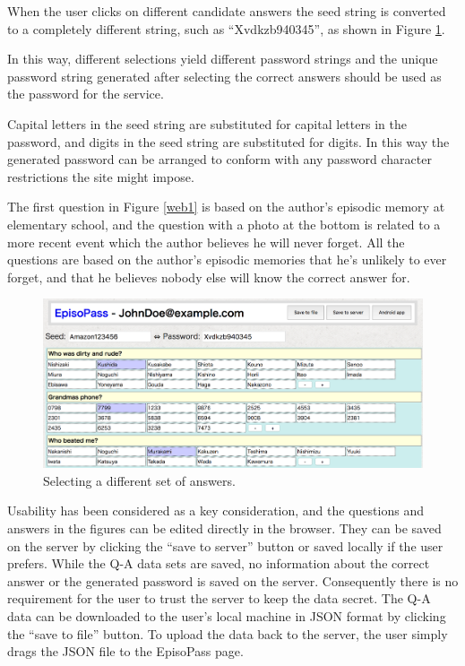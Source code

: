 \documentclass[runningheads,a4paper]{llncs}
\begin{document}
When the user clicks on different candidate answers 
the seed string is converted to a completely different string, such as
``\textsf{Xvdkzb940345}'', as shown in Figure \ref{web11}.

In this way, different selections yield different password strings and
the unique password string generated after selecting the correct answers should be
used as the password for the service.

%

Capital letters in the seed string are substituted for capital letters in the password,
and digits in the seed string are substituted for digits. In this way
the generated password can be arranged to conform with any password character restrictions
the site might impose.

The first question in Figure \ref{web1}
is based on the author's episodic memory at elementary school,
and the question with a photo at the bottom is related to a more recent event
which the author believes he will never forget.
All the questions are based on the author's episodic memories that he's unlikely to ever forget,
and that he believes nobody else will know the correct answer for.

\begin{figure}
\centering
\includegraphics[width=1.0\columnwidth]{figures/8447eaba1ede0f678b3ce6fea63681f3}
\caption{Selecting a different set of answers.}
\label{web11}
\end{figure}

Usability has been considered as a key consideration, and the questions 
and answers in the figures can be edited directly in the browser. They can be
saved on the server by clicking the ``save to server'' button or saved locally
if the user prefers.
While the Q-A data sets are saved, no information about the correct answer or the
generated password is saved on the server. Consequently there is no requirement for the user
to trust the server to keep the data secret.
The Q-A data can be downloaded to the user's local machine in JSON format 
by clicking the ``save to file'' button. To upload the data back to the server, the user
simply drags the JSON file to the EpisoPass page.
\end{document}
